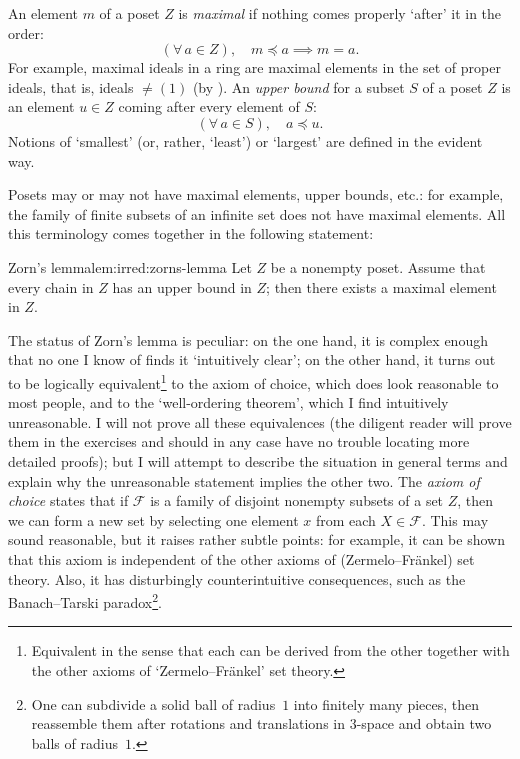 An element $m$ of a poset $Z$ is \emph{maximal} if nothing comes
properly `after' it in the order:
\[(\forall\, a \in Z),\quad m \preceq a \implies m = a.\] For example,
maximal ideals in a ring are maximal elements in the set of proper
ideals, that is, ideals $\neq (1)$ (by
). An \emph{upper bound} for a
subset $S$ of a poset $Z$ is an element $u \in Z$ coming after every
element of $S$:
\[(\forall\, a \in S),\quad a \preceq u.\] Notions of `smallest' (or,
rather, `least') or `largest' are defined in the evident way.

Posets may or may not have maximal elements, upper bounds, etc.: for
example, the family of finite subsets of an infinite set does not have
maximal elements. All this terminology comes together in the following
statement:
\begin{lem}{Zorn's lemma}{lem:irred:zorns-lemma}
  Let $Z$ be a nonempty poset. Assume that every chain in $Z$ has an
  upper bound in $Z$; then there exists a maximal element in $Z$.
\end{lem}

The status of Zorn's lemma is peculiar: on the one hand, it is complex
enough that no one I know of finds it `intuitively clear'; on the
other hand, it turns out to be logically
equivalent\footnote{Equivalent in the sense that each can be derived
  from the other together with the other axioms of
  `Zermelo--Fr\"ankel' set theory.} to the axiom of choice, which does
look reasonable to most people, and to the `well-ordering theorem',
which I find intuitively unreasonable. I will not prove all these
equivalences (the diligent reader will prove them in the exercises and
should in any case have no trouble locating more detailed proofs); but
I will attempt to describe the situation in general terms and explain
why the unreasonable statement implies the other two.  The \emph{axiom
  of choice} states that if $\mathscr{F}$ is a family of disjoint
nonempty subsets of a set $Z$, then we can form a new set by selecting
one element $x$ from each $X \in \mathscr{F}$. This may sound
reasonable, but it raises rather subtle points: for example, it can be
shown that this axiom is independent of the other axioms of
(Zermelo--Fr\"ankel) set theory. Also, it has disturbingly
counterintuitive consequences, such as the Banach--Tarski
paradox\footnote{One can subdivide a solid ball of radius~$1$ into
  finitely many pieces, then reassemble them after rotations and
  translations in $3$-space and obtain two balls of radius~$1$.}.

